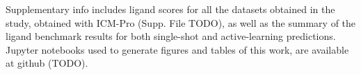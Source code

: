 \begin{suppinfo}

Supplementary info includes ligand scores for all the datasets obtained in the study, obtained with ICM-Pro (Supp. File TODO), as well as the summary of the ligand benchmark results for both single-shot and active-learning predictions. Jupyter notebooks used to generate figures and tables of this work, are available at github (TODO).

\end{suppinfo}
